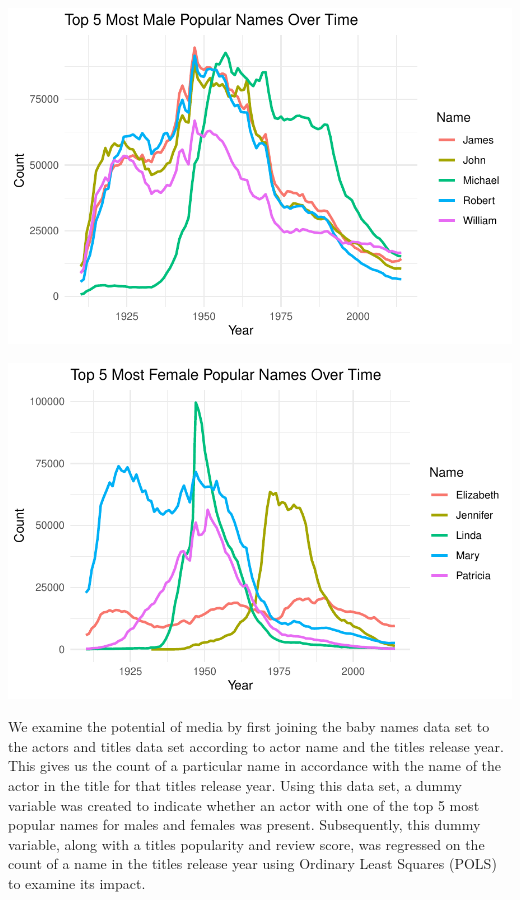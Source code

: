 \documentclass[11pt,preprint, authoryear]{elsarticle}
\let\origfigure\figure
\let\endorigfigure\endfigure
\renewenvironment{figure}[1][2] {
    \expandafter\origfigure\expandafter[H]
} {
    \endorigfigure
}
\numberwithin{equation}{section}
\numberwithin{figure}{section}
\numberwithin{table}{section}
\begin{document}
\begin{figure}[H]

{\centering \includegraphics{Question1_files/figure-latex/Figure2-1} 

}

\caption{Top 5 Male Names Over Time.\label{Figure2}}\label{fig:Figure2}
\end{figure}

\begin{figure}[H]

{\centering \includegraphics{Question1_files/figure-latex/Figure3-1} 

}

\caption{Top 5 Male Names Over Time.\label{Figure3}}\label{fig:Figure3}
\end{figure}

We examine the potential of media by first joining the baby names data
set to the actors and titles data set according to actor name and the
titles release year. This gives us the count of a particular name in
accordance with the name of the actor in the title for that titles
release year. Using this data set, a dummy variable was created to
indicate whether an actor with one of the top 5 most popular names for
males and females was present. Subsequently, this dummy variable, along
with a titles popularity and review score, was regressed on the count of
a name in the titles release year using Ordinary Least Squares (POLS) to
examine its impact.
\end{document}

